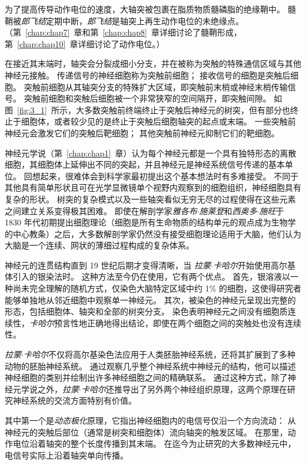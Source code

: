 为了提高传导动作电位的速度，大轴突被包裹在脂质物质髓磷脂的绝缘鞘中。 
髓鞘被\textit{郎飞结}定期中断，\textit{郎飞结}是轴突上再生动作电位的未绝缘点。
（第~\ref{chap:chap7}~章和第~\ref{chap:chap8}~章详细讨论了髓鞘形成，第~\ref{chap:chap10}~章详细讨论了动作电位。）


在接近其末端时，轴突会分裂成细小分支，并在被称为突触的特殊通信区域与其他神经元接触。
传递信号的神经细胞称为突触前细胞；
接收信号的细胞是突触后细胞。
突触前细胞从其轴突分支的特殊扩大区域，即突触前末梢或神经末梢传输信号。
突触前细胞和突触后细胞被一个非常狭窄的空间隔开，即突触间隙。
如图~\ref{fig:3_1}~所示，大多数突触前终端终止于突触后神经元的树突，但有部分也终止于细胞体，或者较少见的是终止于突触后细胞轴突的起点或末端。 
一些突触前神经元会激发它们的突触后靶细胞；
其他突触前神经元抑制它们的靶细胞。


神经元学说（第~\ref{chap:chap1}~章）认为每个神经元都是一个具有独特形态的离散细胞，其细胞体上延伸出不同的突起，并且神经元是神经系统信号传递的基本单位。
回想起来，很难体会到科学家最初提出这个基本想法时有多难接受。
不同于其他具有简单形状且可在光学显微镜单个视野内观察到的细胞组织，神经细胞具有复杂的形状。
树突的复杂模式以及一些轴突看似无穷无尽的过程使得在这些元素之间建立关系变得极其困难。
即使在解剖学家\textit{雅各布$\cdot$施莱登}和\textit{西奥多$\cdot$施旺}于 1830 年代初期提出细胞理论（细胞是所有生命物质的结构单元的观点成为生物学的中心教条）之后，大多数解剖学家仍然没有接受细胞理论适用于大脑，他们认为大脑是一个连续、网状的薄细过程构成的复杂体系。


神经元的连贯结构直到 19 世纪后期才变得清晰，当 \textit{拉蒙$\cdot$卡哈尔}开始使用高尔基体引入的银染法时。
这种方法至今仍在使用，它有两个优点。
首先，银溶液以一种尚未完全理解的随机方式，仅染色大脑特定区域中约 1\% 的细胞，这使得研究者能够单独地从邻近细胞中观察单一神经元。
其次，被染色的神经元呈现出完整的形态，包括细胞体、轴突和全部的树突分支。
染色表明神经元之间没有细胞质连续性，\textit{卡哈尔}预言性地正确地得出结论，即使在两个细胞之间的突触处也没有连续性。


\textit{拉蒙$\cdot$卡哈尔}不仅将高尔基染色法应用于人类胚胎神经系统，还将其扩展到了多种动物的胚胎神经系统。 
通过观察几乎整个神经系统中神经元的结构，他可以描述神经细胞的类别并绘制出许多神经细胞之间的精确联系。
通过这种方式，除了神经元学说之外，\textit{拉蒙$\cdot$卡哈尔}还推导出了另外两个神经组织原理，这两个原理在研究神经系统的交流方面特别有价值。


其中第一个是\textit{动态极化}原理，它指出神经细胞内的电信号仅沿一个方向流动：
从神经元的突触后部位（通常是树突和细胞体）流向轴突的触发区域。
在那里，动作电位沿着轴突的整个长度传播到其末端。
在迄今为止研究的大多数神经元中，电信号实际上沿着轴突单向传播。


